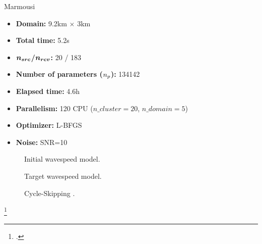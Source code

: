 \begin{frame}{Marmousi}

  \vspace{-0.6cm}
   \begin{multicols}{2}

     \begin{itemize}
       \scriptsize
    \item \textbf{Domain:} 9.2km $\times$ 3km
    \item \textbf{Total time:} 5.2s
    \item \textbf{$\boldsymbol{{n_{src}}}$/$\boldsymbol{{n_{rcv}}}$:} 20 / 183
    \item \textbf{Number of parameters (${n_{p}}$):} 134142
    \item \textbf{Elapsed time:} 4.6h
    \item \textbf{Parallelism:} 120 CPU ($n\_cluster=20$, $n\_domain=5$)
    \item \textbf{Optimizer:} L-BFGS
    \item \textbf{Noise:} SNR=10
    \end{itemize}

     \columnbreak
     \scriptsize
     \setlength{\modelwidth}{6.0cm}
     \begin{figure}
       \renewcommand{\modelfile}{image/mesh_adapt/wadg_adapt_vp_0}
       
       \vspace{-0.3cm}
       \caption*{\scriptsize{Initial wavespeed model.}}
       \label{marmousi_blind_c4}
     \end{figure}
     \vspace{-1.2cm}
     \begin{figure}
       \renewcommand{\modelfile}{image/marmousi}
       
       \vspace{-0.3cm}
       \caption*{\scriptsize{Target wavespeed model.}}
       \label{marmousi_blind_c4}
     \end{figure}
     \vspace{-1.2cm}
          \begin{figure}
       \renewcommand{\modelfile}{image/cycle_skipping}
       
       \vspace{-0.3cm}
       \caption*{\scriptsize{Cycle-Skipping \footnotemark.}}
       \label{marmousi_blind_c4}
     \end{figure}
   \end{multicols}
   \footcite{bunksMultiscaleSeismicWaveform1995}


\end{frame}




